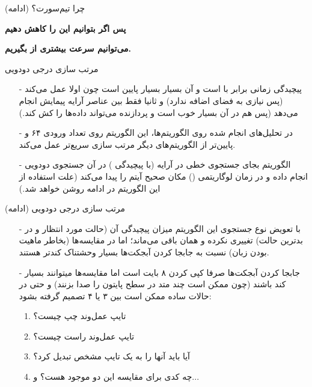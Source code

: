 \begin{frame}{چرا تیم‌سورت؟ (ادامه)}
\begin{center}
{\Large \textbf{پس اگر بتوانیم این  را کاهش دهیم}}

{\Large \textbf{می‌توانیم سرعت بیشتری از  بگیریم.}}
\end{center}
\end{frame}

\begin{frame}{مرتب سازی درجی دودویی}
\begin{itemize}\itemr
\item[-]
پیچیدگی زمانی  برابر با 
است و 
آن بسیار بسیار پایین است چون اولا  عمل می‌کند (پس نیازی به فضای اضافه ندارد) و ثانیا فقط بین عناصر آرایه پیمایش انجام می‌دهد (پس  هم در آن بسیار خوب است و پردازنده می‌تواند داده‌ها را کش کند.)

\item[-]
در تحلیل‌های انجام شده روی الگوریتم‌ها، این الگوریتم روی تعداد ورودی ۶۴ و پایین‌تر از الگوریتم‌های دیگر مرتب سازی سریع‌تر عمل می‌‌کند.

\item[-]
الگوریتم 
بجای جستجوی خطی در آرایه (با پیچیدگی ) در آن جستجوی دودویی انجام داده و در زمان لوگاریتمی () مکان صحیح آیتم را پیدا می‌‌کند (علت استفاده از این الگوریتم در ادامه روشن خواهد شد.)
\end{itemize}
\end{frame}

\begin{frame}{مرتب‌ سازی درجی دودویی (ادامه)}
\begin{itemize}\itemr
\item[-]
با تعویض نوع جستجوی‌ این الگوریتم میزان پیچیدگی آن (حالت مورد انتظار و در بدترین حالت) تغییری نکرده و همان
باقی می‌ماند؛ اما در 
مقایسه‌ها (بخاطر ماهیت  بودن زبان) نسبت به جابجا کردن آبجکت‌ها بسیار وحشتناک کند‌تر هستند.
\item[-]
جابجا کردن آبجکت‌ها صرفا کپی کردن ۸ بایت  است اما مقایسه‌ها میتوانند بسیار کند باشند (چون ممکن است چند متد در سطح پایتون را صدا بزنند) و حتی در حالات ساده ممکن است بین ۳ یا ۴ تصمیم گرفته بشود: 

\begin{enumerate}\itemr
\item 
تایپ عمل‌وند چپ چیست؟
\item 
تایپ عمل‌وند راست چیست؟
\item 
آیا باید آنها را به یک تایپ مشخص تبدیل کرد؟
\item 
چه کدی برای مقایسه این دو موجود هست؟ و...
\end{enumerate}
\end{itemize}
\end{frame}

